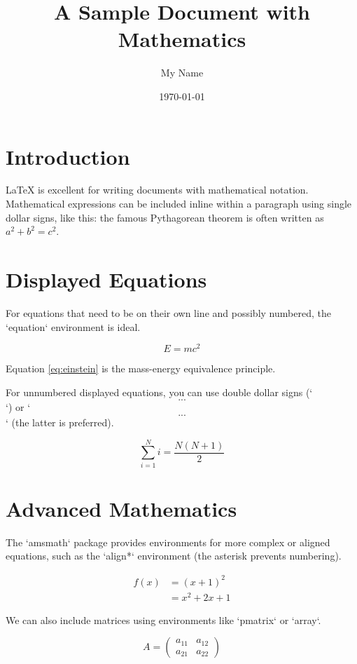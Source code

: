 \documentclass{article}
\title{A Sample Document with Mathematics}
\author{My Name}
\date{\today}
\begin{document}
\maketitle

\section{Introduction}
\LaTeX{} is excellent for writing documents with mathematical notation. Mathematical expressions can be included inline within a paragraph using single dollar signs, like this: the famous Pythagorean theorem is often written as $a^2 + b^2 = c^2$.

\section{Displayed Equations}
For equations that need to be on their own line and possibly numbered, the `equation` environment is ideal.

\begin{equation}
E = mc^2 \label{eq:einstein}
\end{equation}

Equation \ref{eq:einstein} is the mass-energy equivalence principle.

For unnumbered displayed equations, you can use double dollar signs (`$$...$$`) or `\[...\]` (the latter is preferred).

\[
\sum_{i=1}^{N} i = \frac{N(N+1)}{2}
\]

\section{Advanced Mathematics}
The `amsmath` package provides environments for more complex or aligned equations, such as the `align*` environment (the asterisk prevents numbering).

\begin{align*}
f(x) &= (x+1)^2 \\
     &= x^2 + 2x + 1
\end{align*}

We can also include matrices using environments like `pmatrix` or `array`.

\[
A = \begin{pmatrix}
a_{11} & a_{12} \\
a_{21} & a_{22}
\end{pmatrix}
\]
\end{document}
